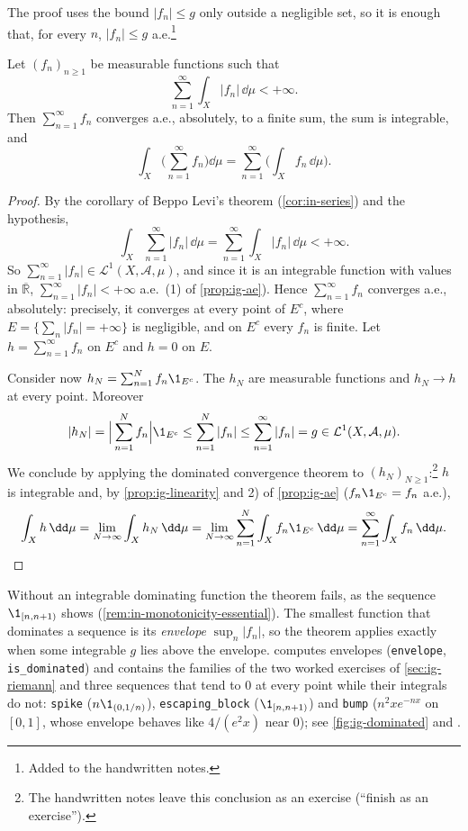 The proof uses the bound $|f_n|\le g$ only outside a negligible set, so it is enough that, for
every $n$, $|f_n|\le g$ a.e.\footnote{Added to the handwritten notes.}

\begin{corollary}[Series]\label{cor:ig-series}
Let $(f_n)_{n\ge1}$ be measurable functions such that
\[
  \sum_{n=1}^\infty\int_X|f_n|\,\dd\mu<+\infty .
\]
Then $\sum_{n=1}^\infty f_n$ converges a.e., absolutely, to a finite sum, the sum is integrable,
and
\[
  \int_X\Big(\sum_{n=1}^\infty f_n\Big)\dd\mu=\sum_{n=1}^\infty\Big(\int_Xf_n\,\dd\mu\Big).
\]
\end{corollary}

\begin{proof}
By the corollary of Beppo Levi's theorem (\cref{cor:in-series}) and the hypothesis,
\[
  \int_X\sum_{n=1}^\infty|f_n|\,\dd\mu=\sum_{n=1}^\infty\int_X|f_n|\,\dd\mu<+\infty .
\]
So $\sum_{n=1}^\infty|f_n|\in\mathcal L^1(X,\mathcal A,\mu)$, and since it is an integrable
function with values in $\overline{\mathbb R}$, $\sum_{n=1}^\infty|f_n|<+\infty$ a.e.\ (1) of
\cref{prop:ig-ae}). Hence $\sum_{n=1}^\infty f_n$ converges a.e., absolutely: precisely, it
converges at every point of $E^c$, where $E=\{\sum_n|f_n|=+\infty\}$ is negligible, and on $E^c$
every $f_n$ is finite. Let $h=\sum_{n=1}^\infty f_n$ on $E^c$ and $h=0$ on $E$.

Consider now $h_N=\sum_{n=1}^Nf_n\1_{E^c}$. The $h_N$ are measurable functions and
$h_N\to h$ at every point. Moreover
\[
  |h_N|=\Big|\sum_{n=1}^Nf_n\Big|\1_{E^c}\le\sum_{n=1}^N|f_n|\le\sum_{n=1}^\infty|f_n|=g
  \in\mathcal L^1(X,\mathcal A,\mu).
\]
We conclude by applying the dominated convergence theorem to $(h_N)_{N\ge1}$:\footnote{The
handwritten notes leave this conclusion as an exercise (``finish as an exercise'').} $h$ is
integrable and, by \cref{prop:ig-linearity} and 2) of \cref{prop:ig-ae} ($f_n\1_{E^c}=f_n$
a.e.),
\[
  \int_Xh\,\dd\mu=\lim_{N\to\infty}\int_Xh_N\,\dd\mu=\lim_{N\to\infty}\sum_{n=1}^N\int_Xf_n\1_{E^c}\,\dd\mu
  =\sum_{n=1}^\infty\int_Xf_n\,\dd\mu .\qedhere
\]
\end{proof}

\begin{remark}[Computational]\label{rem:ig-dominated-code}
Without an integrable dominating function the theorem fails, as the sequence $\1_{[n,n+1)}$
shows (\cref{rem:in-monotonicity-essential}). The smallest function that dominates a sequence is its
\emph{envelope} $\sup_n|f_n|$, so the theorem applies exactly when some integrable $g$ lies
above the envelope.  computes envelopes
(\texttt{envelope}, \texttt{is\_dominated}) and contains the families of the two worked
exercises of \cref{sec:ig-riemann} and three sequences that tend to $0$ at every point while
their integrals do not: \texttt{spike} ($n\1_{(0,1/n)}$), \texttt{escaping\_block}
($\1_{[n,n+1)}$) and \texttt{bump} ($n^2xe^{-nx}$ on $[0,1]$, whose envelope behaves like
$4/(e^2x)$ near $0$); see \cref{fig:ig-dominated} and .
\end{remark}

